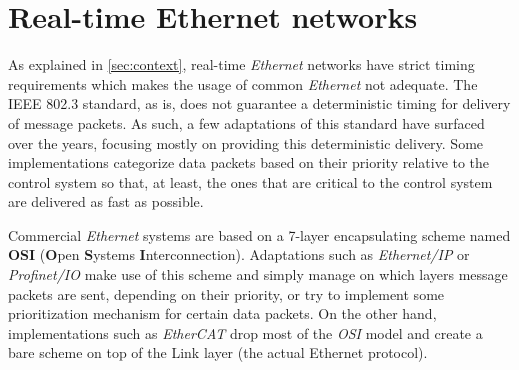 \section{Real-time Ethernet networks}\label{sec:rt-networks}

As explained in \autoref{sec:context}, real-time \emph{Ethernet} networks have strict timing requirements which makes the usage of common \emph{Ethernet} not adequate.
The IEEE 802.3 standard, as is, does not guarantee a deterministic timing for delivery of message packets.
As such, a few adaptations of this standard have surfaced over the years, focusing mostly on providing this deterministic delivery.
Some implementations categorize data packets based on their priority relative to the control system so that, at least, the ones that are critical to the control system are delivered as fast as possible.

Commercial \emph{Ethernet} systems are based on a 7-layer encapsulating scheme named \textbf{OSI} (\textbf Open \textbf Systems \textbf Interconnection).
Adaptations such as \emph{Ethernet/IP} or \emph{Profinet/IO} make use of this scheme and simply manage on which layers message packets are sent, depending on their priority, or try to implement some prioritization mechanism for certain data packets.
On the other hand, implementations such as \emph{EtherCAT} drop most of the \emph{OSI} model and create a bare scheme on top of the Link layer (the actual Ethernet protocol).
